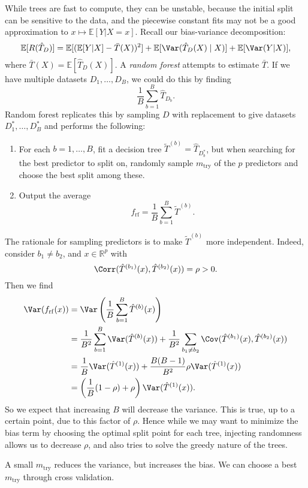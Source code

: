 \documentclass[12pt]{article}
\begin{document}
While trees are fast to compute, they can be unstable, because the initial split can be sensitive to the data, and the piecewise constant fits may not be a good approximation to $x \mapsto \mathbb{E}[Y | X = x]$. Recall our bias-variance decomposition:
\[
\mathbb{E}[R(\hat T_D)] = \mathbb{E}[(\mathbb{E}[Y | X] - \bar T(X))^2] + \mathbb{E}[\Var(\hat T_D(X) \mid X)] + \mathbb{E}[\Var(Y|X)],
\]
where $\bar T(X) = \mathbb{E}[\hat T_D(X)]$. A \emph{random forest} attempts to estimate $\bar T$. If we have multiple datasets $D_1, \ldots, D_B$, we could do this by finding
\[
\frac{1}{B} \sum_{b = 1}^B \hat T_{D_b}.
\]
Random forest replicates this by sampling $D$ with replacement to give datasets $D_1^\ast, \ldots, D_B^\ast$ and performs the following:
\begin{enumerate}
	\item For each $b = 1, \ldots, B$, fit a decision tree $\tilde T^{(b)} = \hat T_{D^\ast_b}$, but when searching for the best predictor to split on, randomly sample $m_{\mathrm{try}}$ of the $p$ predictors and choose the best split among these.
	\item Output the average
		\[
		f_{\mathrm{rf}} = \frac{1}{B} \sum_{b = 1}^B \tilde T^{(b)}.
		\]
\end{enumerate}
The rationale for sampling predictors is to make $\tilde T^{(b)}$ more independent. Indeed, consider $b_1 \neq b_2$, and $x \in \mathbb{R}^p$ with
\[
\Corr(\hat T^{(b_1)}(x), \hat T^{(b_2)}(x)) = \rho > 0.
\]
Then we find
\begin{align*}
	\Var(f_{\mathrm{rf}}(x)) &= \Var \left( \frac{1}{B} \sum_{b = 1}^B \hat T^{(b)}(x) \right) \\
				 &= \frac{1}{B^2} \sum_{b = 1}^B \Var(\hat T^{(b)}(x)) + \frac{1}{B^2} \sum_{b_1 \neq b_2} \Cov(\hat T^{(b_1)}(x), \hat T^{(b_2)}(x)) \\
				 &= \frac{1}{B} \Var(\hat T^{(1)}(x) ) + \frac{B(B-1)}{B^2} \rho \Var(\hat T^{(1)}(x)) \\
				 &= \left(\frac{1}{B}(1 - \rho) + \rho \right) \Var(\hat T^{(1)}(x)).
\end{align*}
So we expect that increasing $B$ will decrease the variance. This is true, up to a certain point, due to this factor of $\rho$. Hence while we may want to minimize the bias term by choosing the optimal split point for each tree, injecting randomness allows us to decrease $\rho$, and also tries to solve the greedy nature of the trees.

A small $m_{\mathrm{try}}$ reduces the variance, but increases the bias. We can choose a best $m_{\mathrm{try}}$ through cross validation.
\end{document}

